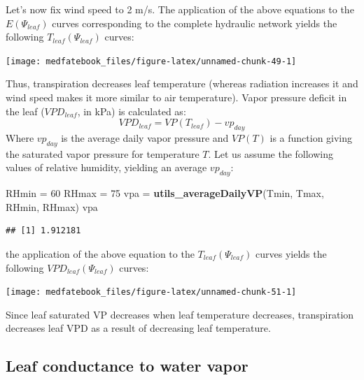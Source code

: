 \documentclass[]{book}
\newenvironment{Shaded}{\begin{snugshade}}{\end{snugshade}}
\newcommand{\KeywordTok}[1]{\textcolor[rgb]{0.13,0.29,0.53}{\textbf{#1}}}
\newcommand{\DecValTok}[1]{\textcolor[rgb]{0.00,0.00,0.81}{#1}}
\newcommand{\StringTok}[1]{\textcolor[rgb]{0.31,0.60,0.02}{#1}}
\newcommand{\NormalTok}[1]{#1}
\begin{document}
Let's now fix wind speed to 2 m/s. The application of the above equations to the \(E(\Psi_{leaf})\) curves corresponding to the complete hydraulic network yields the following \(T_{leaf}(\Psi_{leaf})\) curves:

\begin{center}\texttt{[image: medfatebook\_files/figure-latex/unnamed-chunk-49-1]} \end{center}

Thus, transpiration decreases leaf temperature (whereas radiation increases it and wind speed makes it more similar to air temperature). Vapor pressure deficit in the leaf (\(VPD_{leaf}\), in kPa) is calculated as:
\begin{equation}
VPD_{leaf} = VP(T_{leaf})-vp_{day}
\end{equation}
Where \(vp_{day}\) is the average daily vapor pressure and \(VP(T)\) is a function giving the saturated vapor pressure for temperature \(T\). Let us assume the following values of relative humidity, yielding an average \(vp_{day}\):

\begin{Shaded}
\begin{Highlighting}[]
\NormalTok{RHmin =}\StringTok{ }\DecValTok{60}
\NormalTok{RHmax =}\StringTok{ }\DecValTok{75}
\NormalTok{vpa =}\StringTok{ }\KeywordTok{utils_averageDailyVP}\NormalTok{(Tmin, Tmax, RHmin, RHmax)}
\NormalTok{vpa}
\end{Highlighting}
\end{Shaded}

\begin{verbatim}
## [1] 1.912181
\end{verbatim}

the application of the above equation to the \(T_{leaf}(\Psi_{leaf})\) curves yields the following \(VPD_{leaf}(\Psi_{leaf})\) curves:

\begin{center}\texttt{[image: medfatebook\_files/figure-latex/unnamed-chunk-51-1]} \end{center}

Since leaf saturated VP decreases when leaf temperature decreases, transpiration decreases leaf VPD as a result of decreasing leaf temperature.

\hypertarget{leaf-conductance-to-water-vapor}{%
\subsection{Leaf conductance to water vapor}\label{leaf-conductance-to-water-vapor}}
\end{document}
